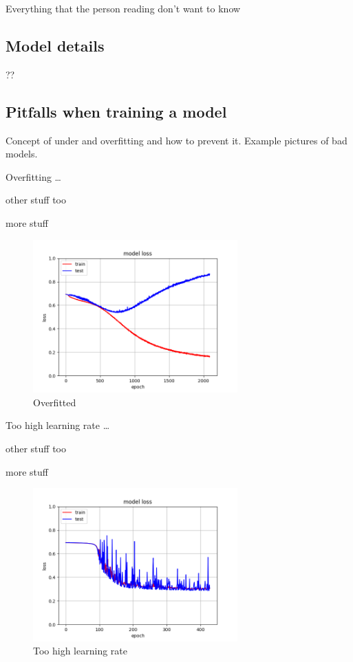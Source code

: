 Everything that the person reading don't want to know


\subsection{Model details}

??

\subsection{Pitfalls when training a model}
Concept of under and overfitting and how to prevent it. Example pictures of bad models.

Overfitting \dots

other stuff too

more stuff

\begin{figure}[H] %
\center
\includegraphics[width=0.7\textwidth]{pictures/overfit.png}
\caption{\label{fig:overfit}Overfitted}
\end{figure}

Too high learning rate \dots

other stuff too

more stuff

\begin{figure}[H]
\center
\includegraphics[width=0.7\textwidth]{pictures/high_lr.png}
\caption{\label{fig:high_lr}Too high learning rate}
\end{figure}


